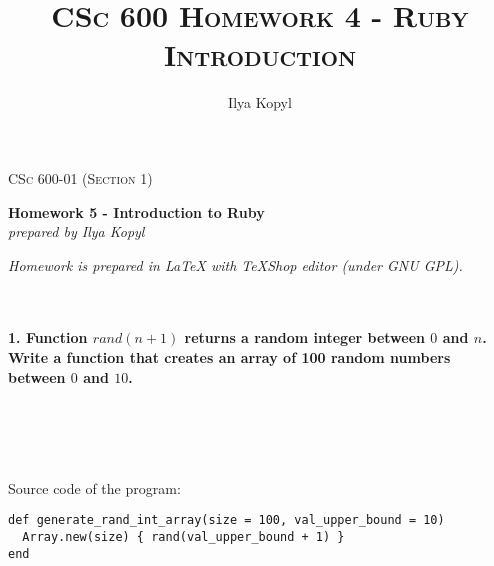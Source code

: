 \documentclass{article}
\author{Ilya Kopyl}
\begin{document}
	\setlength{\grammarparsep}{5pt plus 1pt minus 1pt} %
	\setlength{\grammarindent}{13em} %




	\begin{titlepage}
		\begin{center}
				\Large\textsc{CSc 600-01 (Section 1)}
				
				\Large\textbf{Homework 5 - Introduction to Ruby}\\

				\Large\textit{prepared by Ilya Kopyl}
				
		\end{center}	
	\end{titlepage}


	\title{\textsc{CSc 600 Homework 4 - Ruby Introduction}}	
	\maketitle
	
		\noindent \textit{Homework is prepared in LaTeX with TeXShop editor (under GNU GPL).}
		


	\rmfamily\




	\paragraph{1. Function \(rand(n+1)\) returns a random integer between \(0\) and \(n\). Write a function that creates an array of 100 random numbers between \(0\) and \(10\).}\

\paragraph{}\

Source code of the program:

\begin{verbatim}
def generate_rand_int_array(size = 100, val_upper_bound = 10)
  Array.new(size) { rand(val_upper_bound + 1) }
end
\end{verbatim}
\end{document}
